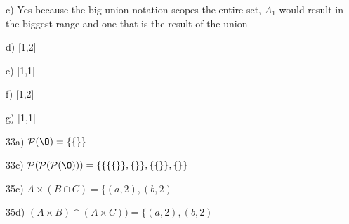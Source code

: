 \documentclass[11pt]{article}
\begin{document}
\begin{flushleft}
c) Yes because the big union notation scopes the entire set, $A_1$ would result in the biggest range and one that is the result of the union

d) [1,2]

e) [1,1]

f) [1,2]

g) [1,1]

\hrulefill

33a) $\mathcal{P}(\O) = \{ \{ \} \}$

33c) $\mathcal{P}(\mathcal{P}(\mathcal{P}(\O))) = \{ \{ \{ \{ \} \},\{ \} \} , \{ \{ \} \} , \{ \}   \}$

\hrulefill

35c) $A\times  (B\cap C) = \{ (a,2),(b,2) $

35d) $(A\times  B)\cap (A\times C)) = \{ (a,2),(b,2) $

\hrulefill
\end{flushleft}
\newpage
\end{document}
